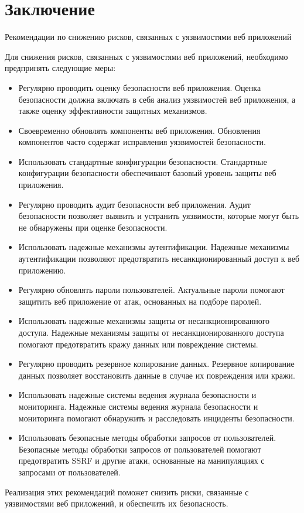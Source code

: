 \section*{Заключение}

Рекомендации по снижению рисков, связанных с уязвимостями веб приложений

Для снижения рисков, связанных с уязвимостями веб приложений, необходимо предпринять следующие меры:

\begin{itemize}
    \item Регулярно проводить оценку безопасности веб приложения. Оценка безопасности должна включать в себя анализ уязвимостей веб приложения, а также оценку эффективности защитных механизмов.
    \item Своевременно обновлять компоненты веб приложения. Обновления компонентов часто содержат исправления уязвимостей безопасности.
    \item Использовать стандартные конфигурации безопасности. Стандартные конфигурации безопасности обеспечивают базовый уровень защиты веб приложения.
    \item Регулярно проводить аудит безопасности веб приложения. Аудит безопасности позволяет выявить и устранить уязвимости, которые могут быть не обнаружены при оценке безопасности.
    \item Использовать надежные механизмы аутентификации. Надежные механизмы аутентификации позволяют предотвратить несанкционированный доступ к веб приложению.
    \item Регулярно обновлять пароли пользователей. Актуальные пароли помогают защитить веб приложение от атак, основанных на подборе паролей.
    \item Использовать надежные механизмы защиты от несанкционированного доступа. Надежные механизмы защиты от несанкционированного доступа помогают предотвратить кражу данных или повреждение системы.
    \item Регулярно проводить резервное копирование данных. Резервное копирование данных позволяет восстановить данные в случае их повреждения или кражи.
    \item Использовать надежные системы ведения журнала безопасности и мониторинга. Надежные системы ведения журнала безопасности и мониторинга помогают обнаружить и расследовать инциденты безопасности.
    \item Использовать безопасные методы обработки запросов от пользователей. Безопасные методы обработки запросов от пользователей помогают предотвратить SSRF и другие атаки, основанные на манипуляциях с запросами от пользователей.
\end{itemize}

Реализация этих рекомендаций поможет снизить риски, связанные с уязвимостями веб приложений, и обеспечить их безопасность.